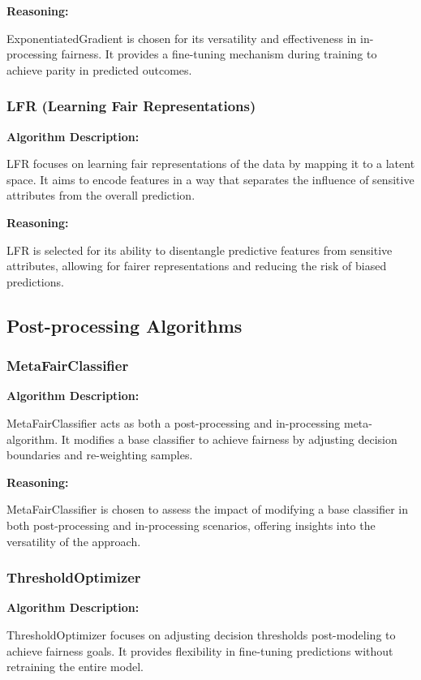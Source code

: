 \textbf{Reasoning:}

ExponentiatedGradient is chosen for its versatility and effectiveness in in-processing fairness. It provides a fine-tuning mechanism during training to achieve parity in predicted outcomes.

\subsubsection{LFR (Learning Fair Representations)}

\textbf{Algorithm Description:}

LFR focuses on learning fair representations of the data by mapping it to a latent space. It aims to encode features in a way that separates the influence of sensitive attributes from the overall prediction.

\textbf{Reasoning:}

LFR is selected for its ability to disentangle predictive features from sensitive attributes, allowing for fairer representations and reducing the risk of biased predictions.

\subsection{Post-processing Algorithms}

\subsubsection{MetaFairClassifier}

\textbf{Algorithm Description:}

MetaFairClassifier acts as both a post-processing and in-processing meta-algorithm. It modifies a base classifier to achieve fairness by adjusting decision boundaries and re-weighting samples.

\textbf{Reasoning:}

MetaFairClassifier is chosen to assess the impact of modifying a base classifier in both post-processing and in-processing scenarios, offering insights into the versatility of the approach.

\subsubsection{ThresholdOptimizer}

\textbf{Algorithm Description:}

ThresholdOptimizer focuses on adjusting decision thresholds post-modeling to achieve fairness goals. It provides flexibility in fine-tuning predictions without retraining the entire model.

